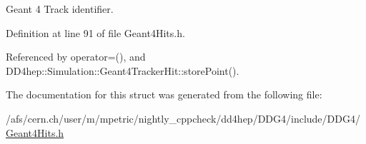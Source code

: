 Geant 4 Track identifier. 



Definition at line 91 of file Geant4\+Hits.\+h.



Referenced by operator=(), and D\+D4hep\+::\+Simulation\+::\+Geant4\+Tracker\+Hit\+::store\+Point().



The documentation for this struct was generated from the following file\+:\begin{DoxyCompactItemize}
\item 
/afs/cern.\+ch/user/m/mpetric/nightly\+\_\+cppcheck/dd4hep/\+D\+D\+G4/include/\+D\+D\+G4/\hyperlink{_geant4_hits_8h}{Geant4\+Hits.\+h}\end{DoxyCompactItemize}
